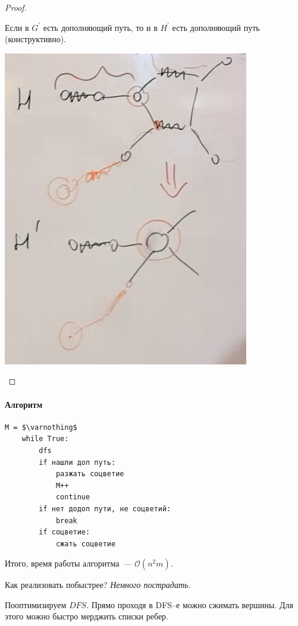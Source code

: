 \begin{proof}
\begin{enumerate}
        Если в $G^\prime$ есть дополняющий путь, то и в $H^\prime$ есть дополняющий путь (конструктивно).
        \begin{center}
            \includegraphics[scale=0.475]{img/parsoch_blossom_cut_proof_2}
        \end{center}
    \end{enumerate}
\end{proof}

\paragraph*{Алгоритм}

\begin{lstlisting}[mathescape=true]
    M = $\varnothing$
    while True:
        dfs
        if нашли доп путь:
            разжать соцветие
            M++
            continue
        if нет додоп пути, не соцветий:
            break
        if соцветие:
            сжать соцветие
\end{lstlisting}

Итого, время работы алгоритма~--- $\mathcal{O}(n^2 m)$.

Как реализовать побыстрее? \textit{Немного пострадать}.

Пооптимизируем $DFS$.
Прямо проходя в DFS--е можно сжимать вершины.
Для этого можно быстро мерджить списки ребер.

